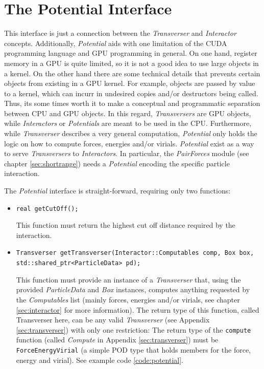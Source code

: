 \documentclass[ twoside,openright,titlepage,numbers=noenddot,%
headinclude,footinclude,cleardoublepage=empty,abstract=on,
BCOR=5mm,paper=a4,fontsize=11pt, dvipsnames
]{scrreprt}
\def\ucpp{uammd_cpp_lexer.py:UAMMDCppLexer -x}
\newcommand{\gpu}{\gls{GPU}\xspace}
\begin{document}
\section{The Potential Interface} \label{sec:potential}

This interface is just a connection between the \emph{Transverser} and \emph{Interactor} concepts. Additionally, \emph{Potential} aids with one limitation of the CUDA programming language and \gls{GPU} programming in general. On one hand, register memory in a \gpu is quite limited, so it is not a good idea to use large objects in a kernel. On the other hand there are some technical details that prevents certain objects from existing in a \gpu kernel. For example, objects are passed by value to a kernel, which can incurr in undesired copies and/or destructors being called. Thus, its some times worth it to make a conceptual and programmatic separation between CPU and \gpu objects.
In this regard, \emph{Transversers} are \gpu objects, while \emph{Interactors} or \emph{Potentials} are meant to be used in the CPU.
Furthermore, while \emph{Transverser} describes a very general computation, \emph{Potential} only holds the logic on how to compute forces, energies and/or virials.
\emph{Potential} exist as a way to serve \emph{Transversers} to \emph{Interactors}. In particular, the \emph{PairForces} module (see chapter \ref{sec:shortrange}) needs a \emph{Potential} encoding the specific particle interaction.

The \emph{Potential} interface is straight-forward, requiring only two functions:
\begin{itemize}
\item \texttt{real getCutOff();}
  
  This function must return the highest cut off distance required by the interaction.
\item \texttt{Transverser getTransverser(Interactor::Computables comp, Box box, std::shared_ptr<ParticleData> pd);}
  
  This function must provide an instance of a \emph{Transverser} that, using the provided \emph{ParticleData} and \emph{Box} instances, computes anything requested by the \emph{Computables} list (mainly forces, energies and/or virials, see chapter \ref{sec:interactor} for more information).
  The return type of this function, called Transverser here, can be any valid \emph{Transverser} (see Appendix \ref{sec:transverser}) with only one restriction: The return type of the \texttt{compute} function (called \emph{Compute} in Appendix \ref{sec:transverser}) must be \texttt{ForceEnergyVirial} (a simple POD type that holds members for the force, energy and virial). See example code \ref{code:potential}.
\end{itemize}
\end{document}
